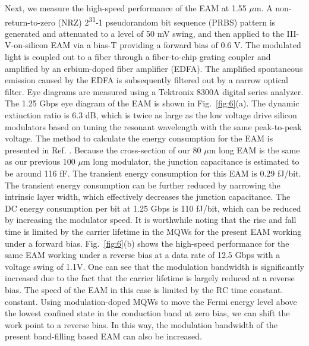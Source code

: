 \documentclass[aip,apl,reprint,a4paper]{revtex4-1}
\def\SP#1{\textsuperscript{#1}}
\begin{document}
Next, we measure the high-speed performance of the EAM at 1.55 $\mu$m. A non-return-to-zero (NRZ)  2\SP{31}-1 pseudorandom bit sequence (PRBS) pattern is generated and  attenuated  to  a  level  of  50 mV  swing,  and then  applied  to  the III-V-on-silicon EAM via a bias-T providing a forward bias of 0.6 V. The modulated light is coupled out to a fiber through a fiber-to-chip grating coupler and amplified by an erbium-doped fiber amplifier (EDFA). The amplified spontaneous emission caused by the EDFA is subsequently filtered out by a narrow optical filter. Eye diagrams are measured using a Tektronix 8300A digital series analyzer. The 1.25 Gbps eye diagram of the EAM is shown in Fig.~\ref{fig:6}(a). The dynamic extinction ratio is 6.3 dB, which is twice as large as the low voltage drive silicon modulators based on tuning the resonant wavelength with the same peak-to-peak voltage.\cite{Shakoor:14} The method to calculate the energy consumption for the EAM is presented in Ref. . Because the cross-section of our 80 $\mu$m long EAM is the same as our previous 100 $\mu$m long modulator,\cite{fu52015} the junction capacitance is estimated to be around 116 fF. The transient energy consumption for this EAM is 0.29 fJ/bit. The transient energy consumption can be further reduced by narrowing the intrinsic layer width, which effectively decreases the junction capacitance. The DC energy consumption per bit at 1.25 Gbps is 110 fJ/bit, which can be reduced by increasing the modulator speed. It is worthwhile noting that the rise and fall time is limited by the carrier lifetime in the MQWs for the present EAM working under a forward bias. Fig.~\ref{fig:6}(b) shows the high-speed performance for the same EAM working under a reverse bias at a data rate of 12.5 Gbps with a voltage swing of 1.1V. One can see that the modulation bandwidth is significantly increased due to the fact that the carrier lifetime is largely reduced at a reverse bias. The speed of the EAM in this case is limited by the RC time constant.\cite{Yong40,fu52015} constant.\cite{Yong40,fu52015} Using modulation-doped MQWs to move the Fermi energy level above the lowest confined state in the conduction band at zero bias, we can shift the work point to a reverse bias.\cite{livescu1988free,kalinovsky1993free} In this way, the modulation bandwidth of the present band-filling based EAM can also be increased.
\end{document}

